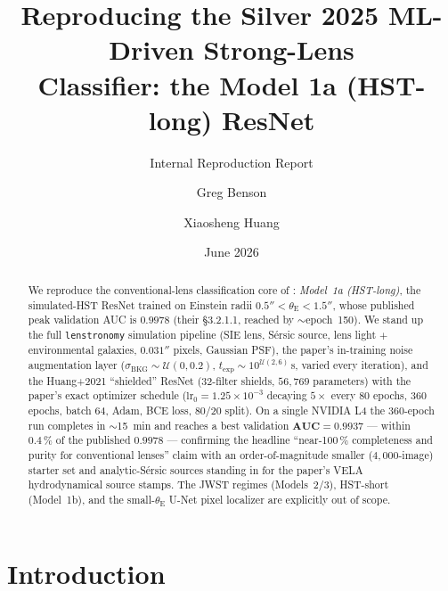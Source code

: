 \documentclass[11pt,letterpaper]{article}
\title{Reproducing the Silver 2025 ML-Driven Strong-Lens\\
       Classifier: the Model 1a (HST-long) ResNet}
\author{Greg Benson \and Xiaosheng Huang}
\date{June 2026}
\newcommand{\thetaE}{\ensuremath{\theta_{\mathrm{E}}}}
\newcommand{\sigBKG}{\ensuremath{\sigma_{\mathrm{BKG}}}}
\newcommand{\texp}{\ensuremath{t_{\mathrm{exp}}}}
\begin{document}
\maketitle
\subtitle{Internal Reproduction Report}

\begin{abstract}
We reproduce the conventional-lens classification core of
\citet{silver2025ml}: \emph{Model~1a (HST-long)}, the simulated-HST
ResNet trained on Einstein radii $0.5'' < \thetaE < 1.5''$, whose
published peak validation AUC is $0.9978$ (their \S3.2.1.1, reached by
$\sim$epoch~150). We stand up the full \texttt{lenstronomy} simulation
pipeline (SIE lens, S\'ersic source, lens light $+$ environmental
galaxies, $0.031''$ pixels, Gaussian PSF), the paper's in-training noise
augmentation layer ($\sigBKG \sim \mathcal{U}(0,0.2)$,
$\texp \sim 10^{\mathcal{U}(2,6)}\,$s, varied every iteration), and the
Huang+2021 ``shielded'' ResNet (32-filter shields, $56{,}769$
parameters) with the paper's exact optimizer schedule ($\mathrm{lr}_0 =
1.25\times10^{-3}$ decaying $5\times$ every 80 epochs, 360 epochs, batch
64, Adam, BCE loss, 80/20 split). On a single NVIDIA L4 the 360-epoch run
completes in $\sim$15~min and reaches a best validation
$\mathbf{AUC = 0.9937}$ --- within $\mathbf{0.4\,\%}$ of the published
$0.9978$ --- confirming the headline ``near-100\,\% completeness and
purity for conventional lenses'' claim with an order-of-magnitude smaller
($4{,}000$-image) starter set and analytic-S\'ersic sources standing in
for the paper's VELA hydrodynamical source stamps. The JWST regimes
(Models~2/3), HST-short (Model~1b), and the small-$\thetaE$ U-Net
pixel localizer are explicitly out of scope.
\end{abstract}

\tableofcontents

\bigskip

\section{Introduction}
\end{document}
